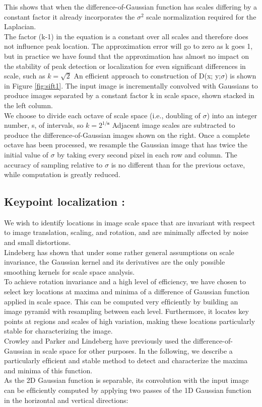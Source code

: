 This shows that when the difference-of-Gaussian function has scales differing by a constant
factor it already incorporates the  $\sigma ^2 $
scale normalization required for the Laplacian. \\The
factor (k-1) in the equation is a constant over all scales and therefore does not inﬂuence
peak location. The approximation error will go to zero as k goes 1, but in practice we have
found that the approximation has almost no impact on the stability of peak detection or
localization for even signiﬁcant differences in scale, such as $k= \sqrt{2}$
An efficient approach to construction of D(x; y;$\sigma$) is shown in Figure \ref{fig:sift1}. The input image
is incrementally convolved with Gaussians to produce images separated by a constant
factor k in scale space, shown stacked in the left column. \\We choose to divide each octave
of scale space (i.e., doubling of $\sigma$) into an integer number, s, of intervals, so $k = 2^{1/\mathbf{s}}$
Adjacent image scales are subtracted to produce the difference-of-Gaussian images shown
on the right. Once a complete octave has been processed, we resample the Gaussian image
that has twice the initial value of $\sigma$ by taking every second pixel in each row and column. \newline
\newline
The accuracy of sampling relative to $\sigma$ is no different than for the previous octave, while
computation is greatly reduced.

\subsection{Keypoint localization :}
We wish to identify locations in image scale space that are
invariant with respect to image translation, scaling, and rotation,
and are minimally affected by noise and small distortions.\\
Lindeberg \cite{e} has shown that under some rather
general assumptions on scale invariance, the Gaussian kernel
and its derivatives are the only possible smoothing kernels
for scale space analysis.\\
To achieve rotation invariance and a high level of efficiency,
we have chosen to select key locations at maxima
and minima of a difference of Gaussian function applied in
scale space. This can be computed very efﬁciently by building
an image pyramid with resampling between each level.
Furthermore, it locates key points at regions and scales of
high variation, making these locations particularly stable for
characterizing the image.\\ Crowley and Parker \cite{f} and Lindeberg
\cite{e} have previously used the difference-of-Gaussian in
scale space for other purposes. In the following, we describe
a particularly efﬁcient and stable method to detect and characterize
the maxima and minima of this function.\\
As the 2D Gaussian function is separable, its convolution
with the input image can be efﬁciently computed by applying
two passes of the 1D Gaussian function in the horizontal
and vertical directions:

